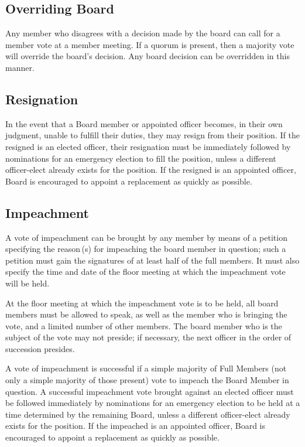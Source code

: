 \subsection{Overriding Board}

Any member who disagrees with a decision made by the board can call for a member vote at a member meeting. If a quorum is present, then a majority vote will override the board's decision. Any board decision can be overridden in this manner.



	\subsection{Resignation}

In the event that a Board member or appointed officer becomes, in their own judgment, unable to fulfill their duties, they may resign from their position. If the resigned is an elected officer, their resignation must be immediately followed by nominations for an emergency election to fill the position, unless a different officer-elect already exists for the position. If the resigned is an appointed officer, Board is encouraged to appoint a replacement as quickly as possible.



	\subsection{Impeachment}

A vote of impeachment can be brought by any member by means of a petition specifying the reason\,(s) for impeaching the board member in question; such a petition must gain the signatures of at least half of the full members. It must also specify the time and date of the floor meeting at which the impeachment vote will be held.

At the floor meeting at which the impeachment vote is to be held, all board members must be allowed to speak, as well as the member who is bringing the vote, and a limited number of other members. The board member who is the subject of the vote may not preside; if necessary, the next officer in the order of succession presides.

A vote of impeachment is successful if a simple majority of Full Members (not only a simple majority of those present) vote to impeach the Board Member in question. A successful impeachment vote brought against an elected officer must be followed immediately by nominations for an emergency election to be held at a time determined by the remaining Board, unless a different officer-elect already exists for the position. If the impeached is an appointed officer, Board is encouraged to appoint a replacement as quickly as possible.



